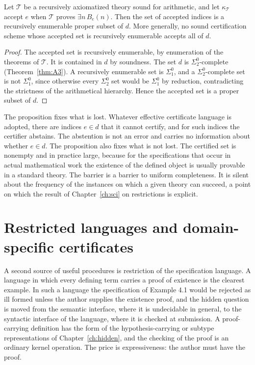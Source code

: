 \begin{proposition}
\label{prop:incomplete}
Let $\mathcal{T}$ be a recursively axiomatized theory sound for arithmetic, and let $\kappa_{\mathcal{T}}$ accept $e$ when $\mathcal{T}$ proves $\exists n\, B_e(n)$. Then the set of accepted indices is a recursively enumerable proper subset of $d$. More generally, no sound certification scheme whose accepted set is recursively enumerable accepts all of $d$.
\end{proposition}

\begin{proof}
The accepted set is recursively enumerable, by enumeration of the theorems of $\mathcal{T}$. It is contained in $d$ by soundness. The set $d$ is $\Sigma^0_2$-complete (Theorem~\ref{thm:A3}). A recursively enumerable set is $\Sigma^0_1$, and a $\Sigma^0_2$-complete set is not $\Sigma^0_1$, since otherwise every $\Sigma^0_2$ set would be $\Sigma^0_1$ by reduction, contradicting the strictness of the arithmetical hierarchy. Hence the accepted set is a proper subset of $d$.
\end{proof}

The proposition fixes what is lost. Whatever effective certificate language is adopted, there are indices $e \in d$ that it cannot certify, and for such indices the certifier abstains. The abstention is not an error and carries no information about whether $e \in d$. The proposition also fixes what is not lost. The certified set is nonempty and in practice large, because for the specifications that occur in actual mathematical work the existence of the defined object is usually provable in a standard theory. The barrier is a barrier to uniform completeness. It is silent about the frequency of the instances on which a given theory can succeed, a point on which the result of Chapter~\ref{ch:sci} on restrictions is explicit.

\section{Restricted languages and domain-specific certificates}

A second source of useful procedures is restriction of the specification language. A language in which every defining term carries a proof of existence is the clearest example. In such a language the specification of Example 4.1 would be rejected as ill formed unless the author supplies the existence proof, and the hidden question is moved from the semantic interface, where it is undecidable in general, to the syntactic interface of the language, where it is checked at submission. A proof-carrying definition has the form of the hypothesis-carrying or subtype representations of Chapter~\ref{ch:hidden}, and the checking of the proof is an ordinary kernel operation. The price is expressiveness: the author must have the proof.

